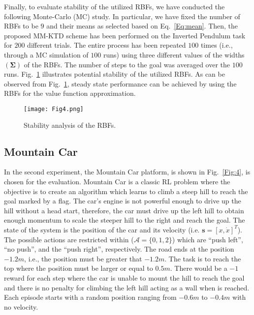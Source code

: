 \documentclass{ieeeaccess}
\def\mA{\mathcal{A}}
\def\Sig{\bm{\Sigma}}
\def\s{\bm{s}}
\begin{document}
Finally, to evaluate stability of the utilized RBFs, we have conducted the following Monte-Carlo (MC) study. In particular, we have fixed the number of RBFs to be $9$ and their means as selected based on Eq.~\eqref{Eq:mean}. Then, the proposed MM-KTD scheme has been performed on the Inverted Pendulum task for $200$ different trials. The entire process has been repeated $100$ times (i.e., through a MC simulation of $100$ runs) using three different values of the widths $(\Sig)$ of the RBFs. The number of steps to the goal was averaged over the $100$ runs. Fig.~\ref{Fig:stab} illustrates potential stability of the utilized RBFs. As can be observed from Fig.~\ref{Fig:stab},  steady state performance can be achieved  by using the RBFs for the value function approximation.
\begin{figure}[t!]
\centering
\texttt{[image: Fig4.png]}
\caption{\small Stability analysis of the RBFs.}\label{Fig:stab}
\end{figure}

\subsection{Mountain Car}  \label{sec:car}
In the second experiment, the Mountain Car platform, is shown in Fig.~\ref{Fig:4}, is chosen for the evaluation. Mountain Car is a classic RL problem where the objective is to create an algorithm which learns to climb a steep hill to reach the goal marked by a flag. The car's engine is not powerful enough to drive up the hill without a head start, therefore, the car must drive up the left hill to obtain enough momentum to scale the steeper hill to the right and reach the goal.
The state of the system is the position of the car and its velocity (i.e. $\s=[x, \dot{x}]^T$).  The possible actions are restricted within ($\mA =\{0, 1,2 \}$) which are ``push left'', ``no push'', and the ``push right'', respectively. The road ends at the position $-1.2m$, i.e., the position must be greater that $-1.2m$. The task is to reach the top  where the position must be larger or equal to $0.5m$. There would be a $-1$ reward for each step where the car is unable to mount the hill to reach the goal and  there is no penalty for climbing the left hill acting as a wall when is reached. Each episode starts with a random position ranging from $-0.6m$ to $-0.4m$ with no velocity.
\end{document}
